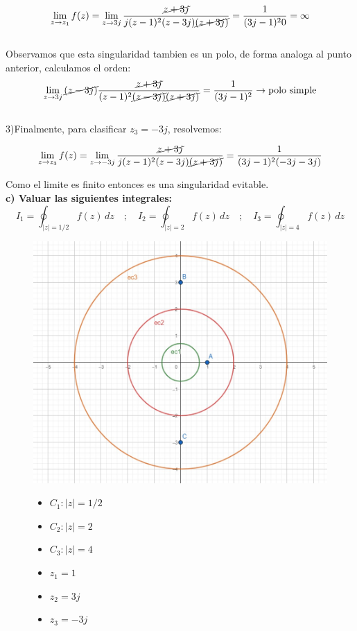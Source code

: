 \documentclass[12pt,a4paper]{report}
\begin{document}
$$\lim_{z \to z_1}f(z)=\lim_{z \to 3j}\frac{\cancel{z+3j}}{j(z - 1)^2(z-3j)\cancel{(z+3j)}}=\frac{1}{(3j-1)^20}=\infty$$\\
Observamos que esta singularidad tambien es un polo, de forma analoga al punto anterior, calculamos el orden:
$$\lim_{z \to 3j}\cancel{(z - 3j)}\frac{\cancel{z+3j}}{(z - 1)^2\cancel{(z-3j)}\cancel{(z+3j)}}
=\frac{1}{(3j-1)^2}\rightarrow \text{polo simple}$$\\

3)Finalmente, para clasificar $z_3=-3j$, resolvemos:

$$\lim_{z \to z_3}f(z)=\lim_{z \to -3j}\frac{\cancel{z+3j}}{j(z - 1)^2(z-3j)\cancel{(z+3j)}}=\frac{1}{(3j-1)^2(-3j-3j)}$$

Como el limite es finito entonces es una singularidad evitable.\\

\textbf{c) Valuar las siguientes integrales:}\\[6pt]
$$
I_1 = \oint_{|z|=1/2} f(z) \, dz\quad;\quad
I_2 = \oint_{|z|=2} f(z) \, dz\quad;\quad
I_3 = \oint_{|z|=4} f(z) \, dz
$$

\begin{figure}[h]
    \centering
    \begin{minipage}{0.65\textwidth}
        \centering
        \includegraphics[width=\textwidth]{./Imagenes/foto1Ej5.jpeg}
    \end{minipage}\hfill
    \begin{minipage}{0.35\textwidth}
        \centering
        \begin{itemize}
            \item $C_1:|z|=1/2$
            \item $C_2:|z|=2$
            \item $C_3:|z|=4$
            \item $z_1=1$
            \item $z_2=3j$
            \item $z_3=-3j$
        \end{itemize}
    \end{minipage}
\end{figure}
\end{document}
